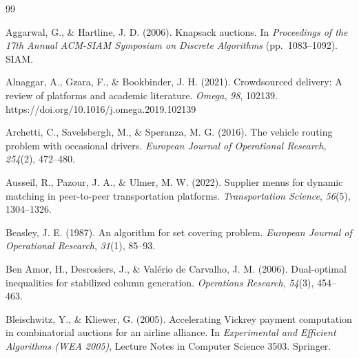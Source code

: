 \clearpage
{}
{}
\renewcommand{\bibname}{References}
\begin{singlespace}
\begin{thebibliography}{99}
\setlength{\itemsep}{4pt}

Aggarwal, G., \& Hartline, J. D. (2006). Knapsack auctions. In
\emph{Proceedings of the 17th Annual ACM-SIAM Symposium on Discrete
Algorithms} (pp.~1083--1092). SIAM. %

Alnaggar, A., Gzara, F., \& Bookbinder, J. H. (2021). Crowdsourced delivery:
A review of platforms and academic literature. \emph{Omega}, \emph{98},
102139. https://doi.org/10.1016/j.omega.2019.102139

Archetti, C., Savelsbergh, M., \& Speranza, M. G. (2016). The vehicle
routing problem with occasional drivers. \emph{European Journal of
Operational Research}, \emph{254}(2), 472--480.

Ausseil, R., Pazour, J. A., \& Ulmer, M. W. (2022). Supplier menus for
dynamic matching in peer-to-peer transportation platforms.
\emph{Transportation Science}, \emph{56}(5), 1304--1326.

Beasley, J. E. (1987). An algorithm for set covering problem.
\emph{European Journal of Operational Research}, \emph{31}(1), 85--93.

Ben Amor, H., Desrosiers, J., \& Val{\'e}rio de Carvalho, J. M. (2006).
Dual-optimal inequalities for stabilized column generation.
\emph{Operations Research}, \emph{54}(3), 454--463.

Bleischwitz, Y., \& Kliewer, G. (2005). Accelerating Vickrey payment
computation in combinatorial auctions for an airline alliance. In
\emph{Experimental and Efficient Algorithms (WEA 2005)}, Lecture Notes in
Computer Science 3503. Springer. %


\end{thebibliography}
\end{singlespace}

